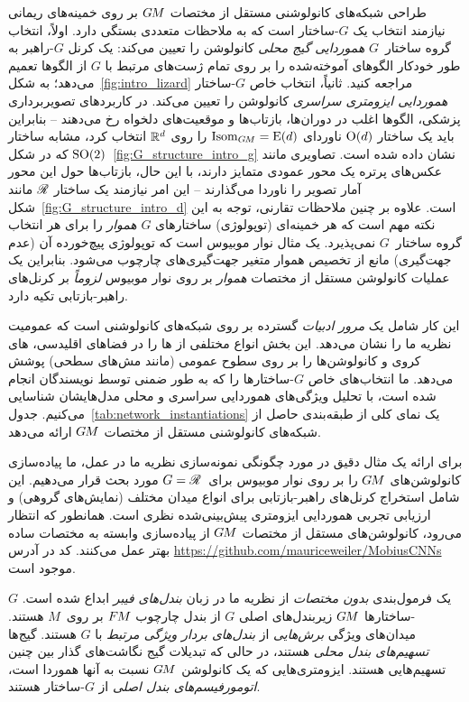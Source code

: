 طراحی شبکه‌های کانولوشنی مستقل از مختصات $G\mkern-1.4muM$ بر روی خمینه‌های ریمانی نیازمند انتخاب یک $G$-ساختار است که به ملاحظات متعددی بستگی دارد.
اولاً، انتخاب گروه ساختار~$G$ \emph{هموردایی گیج محلی} کانولوشن را تعیین می‌کند:
یک کرنل $G$-راهبر به طور خودکار الگوهای آموخته‌شده را بر روی تمام ژست‌های مرتبط با $G$ از الگوها تعمیم می‌دهد؛ به شکل~\ref{fig:intro_lizard} مراجعه کنید.
ثانیاً، انتخاب خاص $G$-ساختار \emph{هموردایی ایزومتری سراسری} کانولوشن را تعیین می‌کند.
در کاربردهای تصویربرداری پزشکی، الگوها اغلب در دوران‌ها، بازتاب‌ها و موقعیت‌های دلخواه رخ می‌دهند
-- بنابراین باید یک ساختار $\operatorname{O}(d)$ ناوردای $\operatorname{Isom}_{G\mkern-1.4muM} = \operatorname{E}(d)$ را روی $\mathbb{R}^d$ انتخاب کرد، مشابه ساختار $\operatorname{SO}(2)$ که در شکل~\ref{fig:G_structure_intro_g} نشان داده شده است.
تصاویری مانند عکس‌های پرتره یک محور عمودی متمایز دارند، با این حال، بازتاب‌ها حول این محور آمار تصویر را ناوردا می‌گذارند
-- این امر نیازمند یک ساختار $\mathscr{R}$ مانند شکل~\ref{fig:G_structure_intro_d} است.
علاوه بر چنین ملاحظات تقارنی، توجه به این نکته مهم است که هر خمینه‌ای (توپولوژی) ساختارهای $G$ \emph{هموار} را برای هر انتخاب گروه ساختار~$G$ نمی‌پذیرد.
یک مثال نوار موبیوس است که توپولوژی پیچ‌خورده آن (عدم جهت‌گیری) مانع از تخصیص هموار متغیر جهت‌گیری‌های چارچوب می‌شود.
بنابراین یک عملیات کانولوشن مستقل از مختصات \emph{هموار} بر روی نوار موبیوس \emph{لزوماً} بر کرنل‌های راهبر-بازتابی تکیه دارد.


این کار شامل یک \emph{مرور ادبیات} گسترده بر روی شبکه‌های کانولوشنی است که عمومیت نظریه ما را نشان می‌دهد.
این بخش انواع مختلفی از \CNN{}ها را در فضاهای اقلیدسی، \CNN{}های کروی و کانولوشن‌ها را بر روی سطوح عمومی (مانند مش‌های سطحی) پوشش می‌دهد.
ما انتخاب‌های خاص $G$-ساختارها را که به طور ضمنی توسط نویسندگان انجام شده است، با تحلیل ویژگی‌های هموردایی سراسری و محلی مدل‌هایشان شناسایی می‌کنیم.
جدول~\ref{tab:network_instantiations} یک نمای کلی از طبقه‌بندی حاصل از شبکه‌های کانولوشنی مستقل از مختصات $G\mkern-1.4muM$ ارائه می‌دهد.


برای ارائه یک مثال دقیق در مورد چگونگی نمونه‌سازی نظریه ما در عمل، ما پیاده‌سازی کانولوشن‌های $G\mkern-1.4muM$ را بر روی نوار موبیوس برای~$G=\mathscr{R}$ مورد بحث قرار می‌دهیم.
این شامل استخراج کرنل‌های راهبر-بازتابی برای انواع میدان مختلف (نمایش‌های گروهی) و ارزیابی تجربی هموردایی ایزومتری پیش‌بینی‌شده نظری است.
همانطور که انتظار می‌رود، کانولوشن‌های مستقل از مختصات $G\mkern-1.4muM$ از پیاده‌سازی وابسته به مختصات ساده بهتر عمل می‌کنند.
کد در آدرس \url{https://github.com/mauriceweiler/MobiusCNNs} موجود است.

یک فرمول‌بندی \emph{بدون مختصات} از نظریه ما در زبان \emph{بندل‌های فیبر} ابداع شده است.
$G$-ساختارها $G\mkern-1.4muM$ زیربندل‌های اصلی $G$ از بندل چارچوب $F\mkern-1.5muM$ بر روی~$M$ هستند.
میدان‌های ویژگی \emph{برش‌هایی} از \emph{بندل‌های بردار ویژگی مرتبط} با $G$ هستند.
گیج‌ها \emph{تسهیم‌های بندل محلی} هستند، در حالی که تبدیلات گیج نگاشت‌های گذار بین چنین تسهیم‌هایی هستند.
ایزومتری‌هایی که یک کانولوشن $G\mkern-1.4muM$ نسبت به آنها هموردا است، \emph{اتومورفیسم‌های بندل اصلی} از $G$-ساختار هستند.


